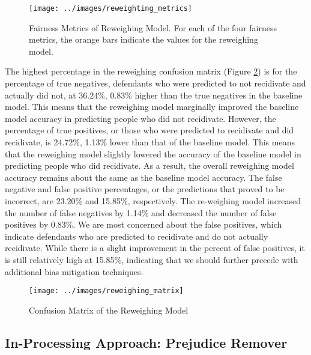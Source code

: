 \documentclass[,article,,moreauthors,pdftex]{mdpi}
\begin{document}
\begin{figure}

{\centering \texttt{[image: ../images/reweighting\_metrics]} 

}

\caption{Fairness Metrics of Reweighing Model. For each of the four fairness metrics, the orange bars indicate the values for the reweighing model.}\label{fig:reweighing metrics}
\end{figure}

The highest percentage in the reweighing confusion matrix (Figure
\ref{fig:reweighing matrix}) is for the percentage of true negatives,
defendants who were predicted to not recidivate and actually did not, at
36.24\%, 0.83\% higher than the true negatives in the baseline model.
This means that the reweighing model marginally improved the baseline
model accuracy in predicting people who did not recidivate. However, the
percentage of true positives, or those who were predicted to recidivate
and did recidivate, is 24.72\%, 1.13\% lower than that of the baseline
model. This means that the reweighing model slightly lowered the
accuracy of the baseline model in predicting people who did recidivate.
As a result, the overall reweighing model accuracy remains about the
same as the baseline model accuracy. The false negative and false
positive percentages, or the predictions that proved to be incorrect,
are 23.20\% and 15.85\%, respectively. The re-weighing model increased
the number of false negatives by 1.14\% and decreased the number of
false positives by 0.83\%. We are most concerned about the false
positives, which indicate defendants who are predicted to recidivate and
do not actually recidivate. While there is a slight improvement in the
percent of false positives, it is still relatively high at 15.85\%,
indicating that we should further precede with additional bias
mitigation techniques.

\begin{figure}

{\centering \texttt{[image: ../images/reweighing\_matrix]} 

}

\caption{Confusion Matrix of the Reweighing Model}\label{fig:reweighing matrix}
\end{figure}

\hypertarget{in-processing-approach-prejudice-remover}{%
\subsection{In-Processing Approach: Prejudice
Remover}\label{in-processing-approach-prejudice-remover}}
\end{document}
